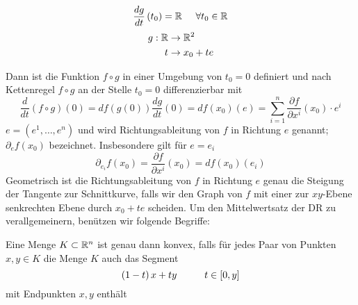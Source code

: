 \begin{figure}[H]
\begin{minipage}[b]{0.45\linewidth}

\begin{center}
\end{center}

\end{minipage}
\hspace{0.5cm}
\begin{minipage}[b]{0.45\linewidth}

\centering
\[\frac{dg}{dt}\left( t_0\right)=\mathbb{R}\hspace{5mm}\forall t_0\in\mathbb{R}\]
\begin{align*}
g:\mathbb{R}&\to\mathbb{R}^2\\
t&\to x_0+te
\end{align*}

\end{minipage}
\end{figure}


Dann ist die Funktion $f\circ g$ in einer Umgebung von $t_0=0$ definiert und nach Kettenregel $f\circ g$ an der Stelle $t_0=0$ differenzierbar mit
\[\frac{d}{{dt}}\left( {f \circ g} \right)\left( 0 \right) = df\left( {g\left( 0 \right)} \right)\frac{{dg}}{{dt}}\left( 0 \right) = df\left( {{x_0}} \right)\left( e \right) = \sum\limits_{i = 1}^n {\frac{{\partial f}}{{\partial {x^i}}}\left( {{x_0}} \right) \cdot {e^i}} \]
$e=\left( e^1,\dots, e^n\right) $ und wird Richtungsableitung von $f$ in Richtung $e$ genannt; $\partial_ef\left( x_0\right)$ bezeichnet. Insbesondere gilt für $e=e_i$
\[{\partial _{{e_i}}}f\left( {{x_0}} \right) = \frac{{\partial f}}{{\partial {x^i}}}\left( {{x_0}} \right) = df\left( {{x_0}} \right)\left( {{e_i}} \right)\]
Geometrisch ist die Richtungsableitung von $f$ in Richtung $e$ genau die Steigung der Tangente zur Schnittkurve, falls wir den Graph von $f$ mit einer zur $xy$-Ebene senkrechten Ebene durch $x_0+te$ scheiden.
Um den Mittelwertsatz der DR zu verallgemeinern, benützen wir folgende Begriffe:
\begin{definition}{8.19}
Eine Menge $K\subset \mathbb{R}^n$ ist genau dann konvex, falls für jedes Paar von Punkten $x,y\in K$ die Menge $K$ auch das Segment \[\left( 1-t\right) x+ty\hspace{10mm} t\in\lbrack 0,y\rbrack\] mit Endpunkten $x,y$ enthält
\end{definition}

